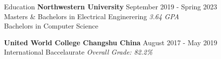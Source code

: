 \documentclass{resume}
\begin{document}
\begin{rSection}{Education}
    {\bf Northwestern University}
    \hfill {September 2019 - Spring 2023} \\ 
    Masters \& Bachelors in Electrical Enginerering
    \hfill {\em 3.64 GPA} \\
    Bachelors in Computer Science

    {\bf United World College Changshu China}
    \hfill {August 2017 - May 2019} \\
    International Baccelaurate
    \hfill {\em Overall Grade: 82.2\%}
\end{rSection}

\end{document}
